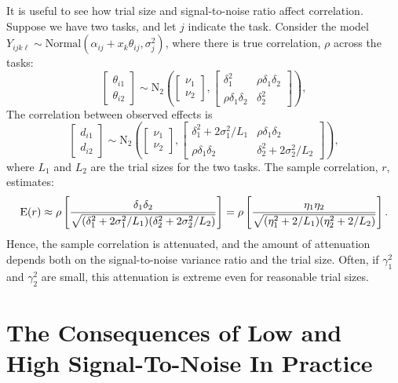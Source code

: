 \documentclass[
  ,man]{apa6}
\begin{document}
It is useful to see how trial size and signal-to-noise ratio affect correlation. Suppose we have two tasks, and let \(j\) indicate the task. Consider the model \(Y_{ijk\ell} \sim \mbox{Normal}(\alpha_{ij}+x_k\theta_{ij},\sigma^2_j)\), where there is true correlation, \(\rho\) across the tasks:
\[
\begin{bmatrix}
\theta_{i1}\\ \theta_{i2}
\end{bmatrix}
\sim \mbox{N}_2\left(
\begin{bmatrix}\nu_1\\ \nu_2\end{bmatrix},
\begin{bmatrix} \delta_1^2 & \rho\delta_1\delta_2\\\rho\delta_1\delta_2 & \delta_2^2\end{bmatrix}\right),
\]
The correlation between observed effects is
\[
\begin{bmatrix}
d_{i1}\\ d_{i2}
\end{bmatrix}
\sim \mbox{N}_2\left(
\begin{bmatrix}\nu_1\\ \nu_2\end{bmatrix},
\begin{bmatrix} \delta_1^2+2\sigma^2_1/L_1 & \rho\delta_1\delta_2\\\rho\delta_1\delta_2 & \delta_2^2+2\sigma^2_2/L_2\end{bmatrix}\right),
\]
where \(L_1\) and \(L_2\) are the trial sizes for the two tasks. The sample correlation, \(r\), estimates:
\[
\mbox{E}(r) \approx \rho \left[\frac{\delta_1\delta_2}{\sqrt{(\delta_1^2+2\sigma^2_1/L_1)(\delta_2^2+2\sigma_2^2/L_2)}}\right] =
\rho \left[ \frac{\eta_1\eta_2}{\sqrt{(\eta_1^2+2/L_1)(\eta_2^2+2/L_2)}}\right].
\]
Hence, the sample correlation is attenuated, and the amount of attenuation depends both on the signal-to-noise variance ratio and the trial size. Often, if \(\gamma^2_1\) and \(\gamma^2_2\) are small, this attenuation is extreme even for reasonable trial sizes.

\hypertarget{the-consequences-of-low-and-high-signal-to-noise-in-practice}{%
\section{The Consequences of Low and High Signal-To-Noise In Practice}\label{the-consequences-of-low-and-high-signal-to-noise-in-practice}}
\end{document}
